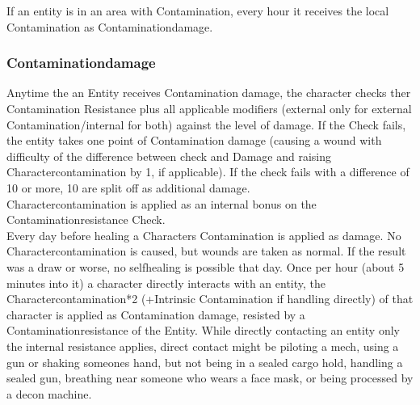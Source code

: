 \documentclass{article}
\begin{document}
    If an entity is in an area with Contamination, every hour it receives the local Contamination
    as Contaminationdamage.\par

    \subsubsection{Contaminationdamage}
    Anytime the an Entity receives Contamination damage, the character checks ther Contamination
    Resistance plus all applicable modifiers (external only for external Contamination/internal for both) against the
    level of damage. If the Check fails, the entity takes one point of Contamination damage (causing a wound with
    difficulty of the difference between check and Damage and raising Charactercontamination by 1, if applicable).
    If the check fails with a difference of 10 or more, 10 are split off as additional damage. \\
    Charactercontamination is applied as an internal bonus on the Contaminationresistance Check. \\

    Every day before healing a Characters Contamination is applied as damage. No Charactercontamination is caused,
    but wounds are taken as normal. If the result was a draw or worse, no selfhealing is possible that day.
    Once per hour (about 5 minutes into it) a character directly interacts with an entity, the Charactercontamination*2
    (+Intrinsic Contamination if handling directly) of that character is applied as Contamination damage,
    resisted by a Contaminationresistance of the Entity. While directly contacting an entity only the internal
    resistance applies, direct contact might be piloting a mech, using a gun or shaking someones hand, but not being in
    a sealed cargo hold, handling a sealed gun, breathing near someone who wears a face mask, or being processed
    by a decon machine. \\
\end{document}
